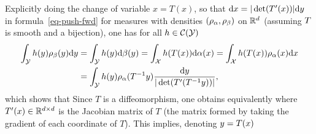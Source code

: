 \begin{rem}
Explicitly doing the change of variable $x=T(x)$, so that $\mathrm{d} x = |\det(T'(x))| \mathrm{d} y$ in formula~\eqref{eq-push-fwd} for measures with densities $(\rho_{\alpha},\rho_{\beta})$ on $\mathbb{R}^d$ (assuming $T$ is smooth and a bijection), one has for all $h \in \mathcal{C}(\mathcal{Y})$
\begin{align*}
	\int_{\mathcal{Y}} h(y)\rho_\beta(y) \mathrm{d} y &= \int_{\mathcal{Y}} h(y) \mathrm{d} \beta(y) = \int_{\mathcal{X}} h(T(x)) \mathrm{d} \alpha(x) = \int_{\mathcal{X}} h(T(x)) \rho_\alpha(x) \mathrm{d} x \\
		&= \int_{\mathcal{Y}} h(y) \rho_\alpha(T^{-1}y) \frac{\mathrm{d} y}{|\det(T'( T^{-1} y))|}, 
\end{align*}
which shows that 
Since $T$ is a diffeomorphism, one obtains equivalently
where $T'(x) \in \mathbb{R}^{d \times d}$ is the Jacobian matrix of $T$ (the matrix formed by taking the gradient of each coordinate of $T$).
%
This implies, denoting $y=T(x)$
\end{rem}







